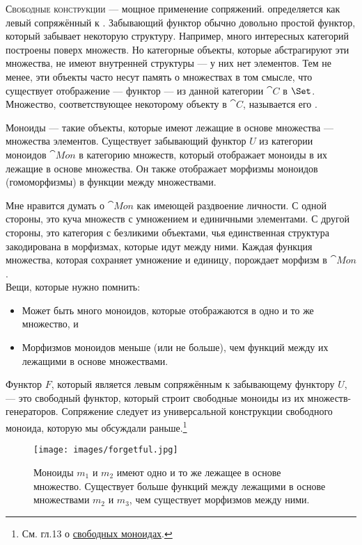 
\lettrine[lhang=0.17]{С}{вободные конструкции ---} мощное применение сопряжений.
 определяется как левый сопряжённый к . Забывающий функтор обычно довольно простой функтор, который
забывает некоторую структуру. Например, много интересных категорий
построены поверх множеств. Но категорные объекты, которые абстрагируют эти
множества, не имеют внутренней структуры --- у них нет элементов. Тем не менее, эти
объекты часто несут память о множествах в том смысле, что существует
отображение --- функтор --- из данной категории $\cat{C}$ в
$\Set$. Множество, соответствующее некоторому объекту в $\cat{C}$, называется
его .

Моноиды --- такие объекты, которые имеют лежащие в основе множества --- множества элементов.
Существует забывающий функтор $U$ из категории моноидов
$\cat{Mon}$ в категорию множеств, который отображает моноиды в их
лежащие в основе множества. Он также отображает морфизмы моноидов (гомоморфизмы) в
функции между множествами.

Мне нравится думать о $\cat{Mon}$ как имеющей раздвоение личности. С одной
стороны, это куча множеств с умножением и единичными элементами. С
другой стороны, это категория с безликими объектами, чья единственная
структура закодирована в морфизмах, которые идут между ними. Каждая
функция множества, которая сохраняет умножение и единицу, порождает
морфизм в $\cat{Mon}$.\\
\newline
Вещи, которые нужно помнить:

\begin{itemize}
  \tightlist
  \item
        Может быть много моноидов, которые отображаются в одно и то же множество, и
  \item
        Морфизмов моноидов меньше (или не больше), чем
        функций между их лежащими в основе множествами.
\end{itemize}

\noindent
Функтор $F$, который является левым сопряжённым к забывающему функтору
$U$, --- это свободный функтор, который строит свободные моноиды из их
множеств-генераторов. Сопряжение следует из универсальной конструкции свободного моноида,
которую мы обсуждали раньше.\footnote{См. гл.13 о
  \hyperref[free-monoids]{свободных моноидах}.}

\begin{figure}[H]
  \centering
  \texttt{[image: images/forgetful.jpg]}
  \caption{Моноиды $m_1$ и $m_2$ имеют одно и то же
    лежащее в основе множество. Существует больше функций между лежащими в основе множествами
    $m_2$ и $m_3$, чем существует морфизмов
    между ними.}
\end{figure}

